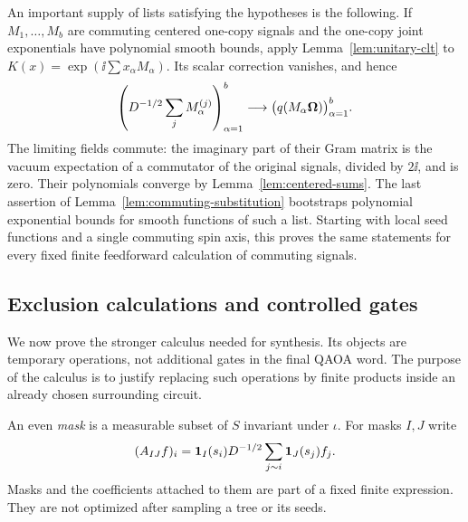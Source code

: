 An important supply of lists satisfying the hypotheses is the
following.  If $M_1,\ldots,M_b$ are commuting centered one-copy
signals and the one-copy joint exponentials have polynomial
smooth bounds, apply Lemma~\ref{lem:unitary-clt} to
$K(x)=\exp(\ii\sum x_\alpha M_\alpha)$.  Its scalar correction
vanishes, and hence
\begin{equation}\label{eq:commuting-signal-limit}
 \left(D^{-1/2}\sum_jM_\alpha^{(j)}\right)_{\alpha=1}^b
 \longrightarrow \bigl(q(M_\alpha\boldsymbol\Omega)\bigr)_{\alpha=1}^b.
\end{equation}
The limiting fields commute: the imaginary part of their Gram
matrix is the vacuum expectation of a commutator of the original
signals, divided by $2\ii$, and is zero.  Their polynomials
converge by Lemma~\ref{lem:centered-sums}.  The last assertion
of Lemma~\ref{lem:commuting-substitution} bootstraps polynomial
exponential bounds for smooth functions of such a list.  Starting
with local seed functions and a single commuting spin axis, this
proves the same statements for every fixed finite feedforward
calculation of commuting signals.

\subsection{Exclusion calculations and controlled gates}
\label{sec:exclusion-calculus}

We now prove the stronger calculus needed for synthesis.  Its
objects are temporary operations, not additional gates in the
final QAOA word.  The purpose of the calculus is to justify
replacing such operations by finite products inside an already
chosen surrounding circuit.

An even \emph{mask} is a measurable subset of $S$ invariant
under $\iota$.  For masks $I,J$ write
\begin{equation}\label{eq:masked-adjacency}
 (A_{IJ}f)_i=\mathbf 1_I(s_i)D^{-1/2}
       \sum_{j\sim i}\mathbf 1_J(s_j)f_j.
\end{equation}
Masks and the coefficients attached to them are part of a fixed
finite expression.  They are not optimized after sampling a
tree or its seeds.

